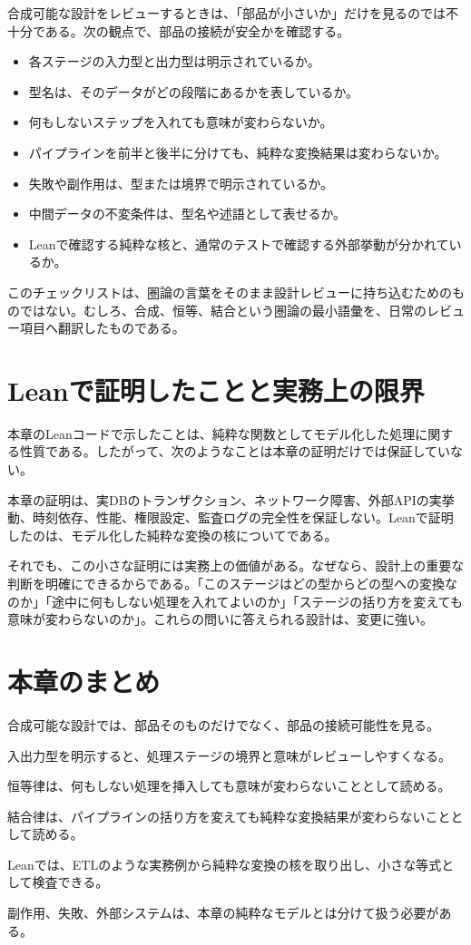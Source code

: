 合成可能な設計をレビューするときは、「部品が小さいか」だけを見るのでは不十分である。次の観点で、部品の接続が安全かを確認する。

\begin{softwarebox}
\begin{itemize}
\item 各ステージの入力型と出力型は明示されているか。
\item 型名は、そのデータがどの段階にあるかを表しているか。
\item 何もしないステップを入れても意味が変わらないか。
\item パイプラインを前半と後半に分けても、純粋な変換結果は変わらないか。
\item 失敗や副作用は、型または境界で明示されているか。
\item 中間データの不変条件は、型名や述語として表せるか。
\item Leanで確認する純粋な核と、通常のテストで確認する外部挙動が分かれているか。
\end{itemize}
\end{softwarebox}

このチェックリストは、圏論の言葉をそのまま設計レビューに持ち込むためのものではない。むしろ、合成、恒等、結合という圏論の最小語彙を、日常のレビュー項目へ翻訳したものである。

\section{Leanで証明したことと実務上の限界}

本章のLeanコードで示したことは、純粋な関数としてモデル化した処理に関する性質である。したがって、次のようなことは本章の証明だけでは保証していない。

\begin{warningbox}
本章の証明は、実DBのトランザクション、ネットワーク障害、外部APIの実挙動、時刻依存、性能、権限設定、監査ログの完全性を保証しない。Leanで証明したのは、モデル化した純粋な変換の核についてである。
\end{warningbox}

それでも、この小さな証明には実務上の価値がある。なぜなら、設計上の重要な判断を明確にできるからである。「このステージはどの型からどの型への変換なのか」「途中に何もしない処理を入れてよいのか」「ステージの括り方を変えても意味が変わらないのか」。これらの問いに答えられる設計は、変更に強い。

\section{本章のまとめ}

合成可能な設計では、部品そのものだけでなく、部品の接続可能性を見る。

入出力型を明示すると、処理ステージの境界と意味がレビューしやすくなる。

恒等律は、何もしない処理を挿入しても意味が変わらないこととして読める。

結合律は、パイプラインの括り方を変えても純粋な変換結果が変わらないこととして読める。

Leanでは、ETLのような実務例から純粋な変換の核を取り出し、小さな等式として検査できる。

副作用、失敗、外部システムは、本章の純粋なモデルとは分けて扱う必要がある。
